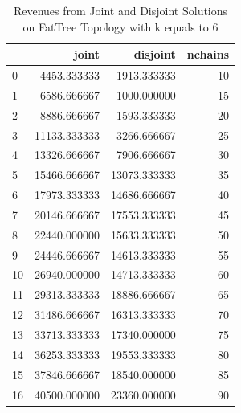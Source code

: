 \begin{table}[H]
    \caption{Revenues from Joint and Disjoint Solutions on FatTree Topology with k equals to 6}
    \label{tbl:joint-vs-disjoin-fattree}
    \medskip
    \centering
    \begin{tabular}{lrrr}
        \toprule
        {} &         joint &      disjoint &  nchains \\
        \midrule
        0  &   4453.333333 &   1913.333333 &       10 \\
        1  &   6586.666667 &   1000.000000 &       15 \\
        2  &   8886.666667 &   1593.333333 &       20 \\
        3  &  11133.333333 &   3266.666667 &       25 \\
        4  &  13326.666667 &   7906.666667 &       30 \\
        5  &  15466.666667 &  13073.333333 &       35 \\
        6  &  17973.333333 &  14686.666667 &       40 \\
        7  &  20146.666667 &  17553.333333 &       45 \\
        8  &  22440.000000 &  15633.333333 &       50 \\
        9  &  24446.666667 &  14613.333333 &       55 \\
        10 &  26940.000000 &  14713.333333 &       60 \\
        11 &  29313.333333 &  18886.666667 &       65 \\
        12 &  31486.666667 &  16313.333333 &       70 \\
        13 &  33713.333333 &  17340.000000 &       75 \\
        14 &  36253.333333 &  19553.333333 &       80 \\
        15 &  37846.666667 &  18540.000000 &       85 \\
        16 &  40500.000000 &  23360.000000 &       90 \\
        \bottomrule
    \end{tabular}
\end{table}

